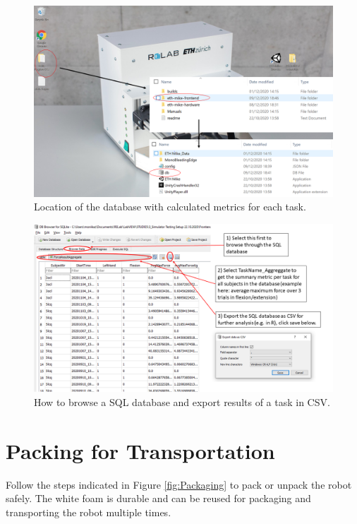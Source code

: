 \documentclass[10pt,oneside,a4paper]{article}
\begin{document}
\begin{figure}[h!]
\begin{center}
\includegraphics[width=\columnwidth]{images/TabletScreenshots/Database.png}
\caption{Location of the database with calculated metrics for each task.}
\label{fig:DatabaseLocation}
\end{center}
\end{figure}

\begin{figure}[h!]
\begin{center}
\includegraphics[width=\columnwidth]{images/TabletScreenshots/ExportDatabase.png}
\caption{How to browse a SQL database and export results of a task in CSV.}
\label{fig:SQLDatabase}
\end{center}
\end{figure}

\newpage
\phantom{blabla}
\newpage
\section{Packing for Transportation}
Follow the steps indicated in Figure \ref{fig:Packaging} to pack or unpack the robot safely. The white foam is durable and can be reused for packaging and transporting the robot multiple times.\\
\end{document}
